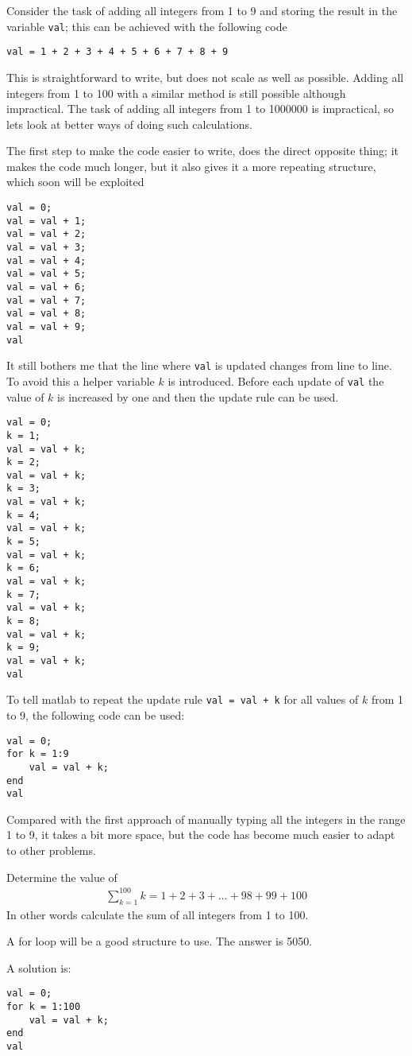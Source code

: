 Consider the task of adding all integers from 1 to 9
and storing the result in the variable \verb!val!;  
this can be achieved with the following code 
\begin{lstlisting}
val = 1 + 2 + 3 + 4 + 5 + 6 + 7 + 8 + 9
\end{lstlisting}
This is straightforward to write, but does not scale
as well as possible.
Adding all integers from 1 to 100 with a similar method
is still possible although impractical.
The task of adding all integers from 1 to 1000000 
is impractical, so lets look at better ways of doing such 
calculations.

The first step to make the code easier to write, does the
direct opposite thing; it makes the code much longer, but it 
also gives it a more repeating structure, which soon will be 
exploited 
\begin{lstlisting}
val = 0;
val = val + 1;
val = val + 2;
val = val + 3;
val = val + 4;
val = val + 5;
val = val + 6;
val = val + 7;
val = val + 8;
val = val + 9;
val
\end{lstlisting}
It still bothers me that the line where \verb!val! is updated
changes from line to line.
To avoid this a helper variable $k$ is introduced.
Before each update of \verb!val! the value of $k$ is 
increased by one and then the update rule can be used.
\begin{lstlisting}
val = 0;
k = 1;
val = val + k;
k = 2;
val = val + k;
k = 3;
val = val + k;
k = 4;
val = val + k;
k = 5;
val = val + k;
k = 6;
val = val + k;
k = 7;
val = val + k;
k = 8;
val = val + k;
k = 9;
val = val + k;
val
\end{lstlisting}
To tell matlab to repeat the update rule \verb!val = val + k! for
all values of $k$ from 1 to 9, the following code can be used:
\begin{lstlisting}
val = 0;
for k = 1:9
    val = val + k;
end
val
\end{lstlisting}
Compared with the first approach of manually typing
all the integers in the range 1 to 9, it takes a bit more space, 
but the code has become much easier to adapt to other problems.


\begin{ex}\label{exSumIntegersUp100}%
Determine the value of 
\begin{align*}
\sum_{k = 1}^{100} k = 1 + 2 + 3 + \ldots + 98 + 99 + 100
\end{align*}
In other words calculate the sum of all integers from 1 to 100.
\begin{hint}
A for loop will be a good structure to use.
The answer is 5050.
\end{hint}
\begin{sol}
A solution is:
\begin{lstlisting}
val = 0;
for k = 1:100
    val = val + k;
end
val
\end{lstlisting}
\end{sol}
\end{ex}


